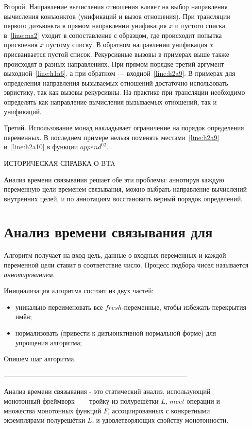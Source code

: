 \documentclass[conference]{IEEEtran}
\begin{document}
Второй. Направление вычисления отношения влияет на выбор направления вычисления конъюнктов (унификаций и вызов отношения).
При трансляции первого дизъюнкта в прямом направлении унификация $x$ и пустого списка в~\ref{line:ma2} уходит в сопоставление с образцом, где происходит попытка присвоения $x$ пустому списку.
В обратном направлении унификация $x$ присваивается пустой список.
Рекурсивные вызовы в примерах выше также происходят в разных направлениях.
При прямом порядке третий аргумент --- выходной~\ref{line:h1a6}, а при обратном --- входной~\ref{line:h2a9}.
В примерах для определения направления вызываемых отношений достаточно использовать эвристику, так как вызовы рекурсивны.
На практике при трансляции необходимо определять как направление вычисления вызываемых отношений, так и унификаций.

Третий. Использование монад накладывает ограничение на порядок определения переменных.
В последнем примере нельзя поменять местами~\ref{line:h2a9} и~\ref{line:h2a10} в функции $append^02$.

ИСТОРИЧЕСКАЯ СПРАВКА О BTA

Анализ времени связывания решает обе эти проблемы: аннотируя каждую переменную цели временем связывания, можно выбрать направление вычислений внутренних целей, и по аннотациям восстановить верный порядок определений.

\section{Анализ времени связывания для \miniKanren{}}\label{bta}

Алгоритм получает на вход цель, данные о входных переменных и каждой переменной цели ставит в соответствие число.
Процесс подбора чисел называется \emph{аннотированием}.

Инициализация алгоритма состоит из двух частей:
\begin{itemize}
    \item уникально переименовать все $fresh$-переменные, чтобы избежать перекрытия имён;
    \item нормализовать (привести к дизъюнктивной нормальной форме) для упрощения алгоритма;
\end{itemize}

Опишем шаг алгоритма.

---------------------------------------------------------------------------------

Анализ времени связывания - это статический анализ, использующий монотонный фреймворк~\cite{kam1977monotone} --- тройку из полурешётки $L$, $meet$-операции и множества монотонных функций $F$, ассоциированных с конкретными экземплярами полурешётки $L$, и удовлетворяющих свойству монотонности.
\end{document}
